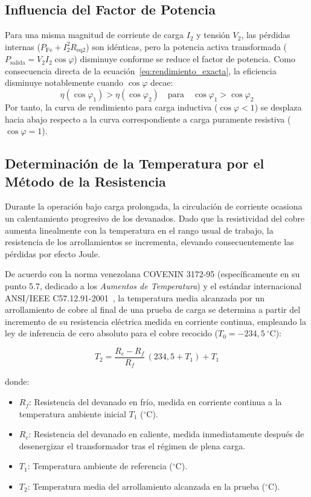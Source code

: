 \subsection{Influencia del Factor de Potencia}

Para una misma magnitud de corriente de carga $I_2$ y tensión $V_2$, las pérdidas internas ($P_{\text{Fe}} + I_2^2 R_{\text{eq2}}$) son idénticas, pero la potencia activa transformada ($P_{\text{salida}} = V_2 I_2 \cos\varphi$) disminuye conforme se reduce el factor de potencia. Como consecuencia directa de la ecuación~\eqref{eq:rendimiento_exacta}, la eficiencia disminuye notablemente cuando $\cos\varphi$ decae:
\begin{equation}
    \eta(\cos\varphi_1) > \eta(\cos\varphi_2) \quad \text{para} \quad \cos\varphi_1 > \cos\varphi_2
\end{equation}
Por tanto, la curva de rendimiento para carga inductiva ($\cos\varphi < 1$) se desplaza hacia abajo respecto a la curva correspondiente a carga puramente resistiva ($\cos\varphi = 1$).

\subsection{Determinación de la Temperatura por el Método de la Resistencia}

Durante la operación bajo carga prolongada, la circulación de corriente ocasiona un calentamiento progresivo de los devanados. Dado que la resistividad del cobre aumenta linealmente con la temperatura en el rango usual de trabajo, la resistencia de los arrollamientos se incrementa, elevando consecuentemente las pérdidas por efecto Joule.

De acuerdo con la norma venezolana COVENIN 3172-95 (específicamente en su punto 5.7, dedicado a los \textit{Aumentos de Temperatura}) y el estándar internacional ANSI/IEEE C57.12.91-2001~\cite{covenin3172, ieee5712}, la temperatura media alcanzada por un arrollamiento de cobre al final de una prueba de carga se determina a partir del incremento de su resistencia eléctrica medida en corriente continua, empleando la ley de inferencia de cero absoluto para el cobre recocido ($T_0 = -234{,}5~^{\circ}\mathrm{C}$):

\begin{equation}
    T_2 = \frac{R_c - R_f}{R_f}\,(234{,}5 + T_1) + T_1
    \label{eq:metodo_resistencia}
\end{equation}

donde:
\begin{itemize}
    \item $R_f$: Resistencia del devanado en frío, medida en corriente continua a la temperatura ambiente inicial $T_1$ ($^{\circ}\mathrm{C}$).
    \item $R_c$: Resistencia del devanado en caliente, medida inmediatamente después de desenergizar el transformador tras el régimen de plena carga.
    \item $T_1$: Temperatura ambiente de referencia ($^{\circ}\mathrm{C}$).
    \item $T_2$: Temperatura media del arrollamiento alcanzada en la prueba ($^{\circ}\mathrm{C}$).
\end{itemize}

